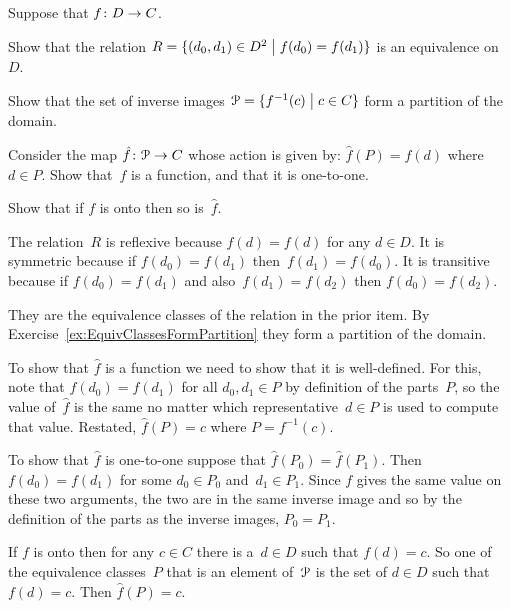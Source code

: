 \documentclass{ibl}  %
\begin{document}
\begin{ex}
Suppose that $\mbox{$f\colon D\to C$}$.
\begin{exes}
\item Show that the relation
  $R=\{(d_0,d_1)\in D^2 \bigm| f(d_0)=f(d_1)\}$ 
  is an equivalence on~$D$. 
\item Show that the set of inverse images 
  $\EuScript{P}=\{f^{-1}(c) \bigm| c\in C\}$ form a partition of the domain.
\item Consider the map
  $\mbox{$\hat{f}\colon \EuScript{P}\to C$}$ whose action is given by:
  $\hat{f}(P)=f(d)$ where $d\in P$.
  Show that~$\hat{f}$ is a function, and that it is one-to-one.
\item Show that if $f$ is onto then so is~$\hat{f}$.
\end{exes}
\begin{ans}
\begin{exes}
\item The relation~$R$ is reflexive because $f(d)=f(d)$ for any $d\in D$.
  It is symmetric because if $f(d_0)=f(d_1)$ then~$f(d_1)=f(d_0)$.
  It is transitive because if $f(d_0)=f(d_1)$ and also~$f(d_1)=f(d_2)$ 
  then $f(d_0)=f(d_2)$.
\item They are the equivalence classes of the relation in the prior 
  item.
  By Exercise~\ref{ex:EquivClassesFormPartition} they form a
  partition of the domain.
\item  To show that $\hat{f}$ is a function we need to show that
  it is well-defined.
  For this, note that $f(d_0)=f(d_1)$ for all $d_0,d_1\in P$
  by definition of the parts~$P$, so 
  the value of~$\hat{f}$ is the same no matter which representative~$d\in P$
  is used to compute that value.
  Restated, $\hat{f}(P)=c$ where $P=f^{-1}(c)$.

  To show that $\hat{f}$ is one-to-one suppose that $\hat{f}(P_0)=\hat{f}(P_1)$.
  Then $f(d_0)=f(d_1)$ for some $d_0\in P_0$ and~$d_1\in P_1$.
  Since $f$ gives the same value on these two arguments,
  the two are in the same inverse image and so  
  by the definition of the parts as the inverse images,
  $P_0=P_1$.
\item If $f$ is onto then for any $c\in C$ there is a~$d\in D$
  such that $f(d)=c$.
  So one of the equivalence classes~$P$ that is an element of~$\EuScript{P}$ 
  is the set of 
  $d\in D$ such that $f(d)=c$.
  Then $\hat{f}(P)=c$.
\end{exes}
\end{ans}
\end{ex}
\end{document}
